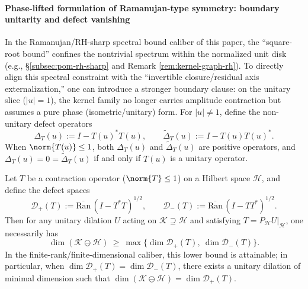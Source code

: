 \paragraph{Phase-lifted formulation of Ramanujan-type symmetry: boundary unitarity and defect vanishing}
In the Ramanujan/RH-sharp spectral bound caliber of this paper, the ``square-root bound'' confines the nontrivial spectrum within the normalized unit disk (e.g., \S\ref{subsec:pom-rh-sharp} and Remark \ref{rem:kernel-graph-rh}).
To directly align this spectral constraint with the ``invertible closure/residual axis externalization,'' one can introduce a stronger boundary clause: on the unitary slice (\(|u|=1\)), the kernel family no longer carries amplitude contraction but assumes a pure phase (isometric/unitary) form.
For \(|u|\neq 1\), define the non-unitary defect operators
\[
\Delta_T(u):=I-T(u)^{*}T(u),\qquad
\widetilde{\Delta}_T(u):=I-T(u)T(u)^{*}.
\]
When \(\norm{T(u)}\le 1\), both \(\Delta_T(u)\) and \(\widetilde{\Delta}_T(u)\) are positive operators, and \(\Delta_T(u)=0=\widetilde{\Delta}_T(u)\) if and only if \(T(u)\) is a unitary operator.
\par

\begin{theorem}\label{thm:xi-defect-residual-degree}
Let \(T\) be a contraction operator (\(\norm{T}\le 1\)) on a Hilbert space \(\mathcal{H}\), and define the defect spaces
\[
\mathcal{D}_{+}(T):=\overline{\mathrm{Ran}}\,(I-T^{*}T)^{1/2},
\qquad
\mathcal{D}_{-}(T):=\overline{\mathrm{Ran}}\,(I-TT^{*})^{1/2}.
\]
Then for any unitary dilation \(U\) acting on \(\mathcal{K}\supseteq \mathcal{H}\) and satisfying
\(
T=P_{\mathcal{H}}U|_{\mathcal{H}}
\), one necessarily has
\[
\dim(\mathcal{K}\ominus\mathcal{H})\ \ge\ \max\{\dim\mathcal{D}_{+}(T),\ \dim\mathcal{D}_{-}(T)\}.
\]
In the finite-rank/finite-dimensional caliber, this lower bound is attainable; in particular, when \(\dim\mathcal{D}_{+}(T)=\dim\mathcal{D}_{-}(T)\), there exists a unitary dilation of minimal dimension such that
\(
\dim(\mathcal{K}\ominus\mathcal{H})=\dim\mathcal{D}_{+}(T)
\).
\end{theorem}


